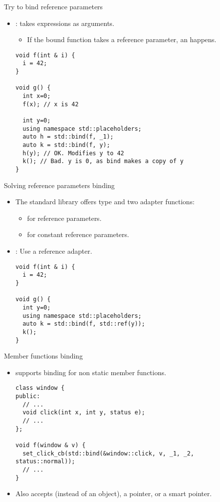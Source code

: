 \begin{frame}[t,fragile]{Try to bind reference parameters}
\begin{itemize}
  \item {}:  takes expressions as arguments.
    \begin{itemize}
      \item If the bound function takes a reference parameter,
            an  happens.
    \end{itemize}
\begin{lstlisting}
void f(int & i) {
  i = 42;
}

void g() {
  int x=0;
  f(x); // x is 42

  int y=0;
  using namespace std::placeholders;
  auto h = std::bind(f, _1);
  auto k = std::bind(f, y);
  h(y); // OK. Modifies y to 42
  k(); // Bad. y is 0, as bind makes a copy of y
}
\end{lstlisting}
\end{itemize}
\end{frame}

\begin{frame}[t,fragile]{Solving reference parameters binding}
\begin{itemize}
  \item The standard library offers type  
        and two adapter functions:
    \begin{itemize}
      \item {} for reference parameters.
      \item {} for constant reference parameters.
    \end{itemize}

  \item {}: Use a reference adapter.
\begin{lstlisting}
void f(int & i) {
  i = 42;
}

void g() {
  int y=0;
  using namespace std::placeholders;
  auto k = std::bind(f, std::ref(y));
  k();
}
\end{lstlisting}
\end{itemize}
\end{frame}

\begin{frame}[t,fragile]{Member functions binding}
\begin{itemize}
  \item {} supports binding for non static member functions.
\begin{lstlisting}
class window {
public:
  // ...
  void click(int x, int y, status e);
  // ...
};

void f(window & v) {
  set_click_cb(std::bind(&window::click, v, _1, _2, status::normal));
  // ...
}
\end{lstlisting}
  \item Also accepts (instead of an object), a pointer, or a smart pointer.
\end{itemize}
\end{frame}

